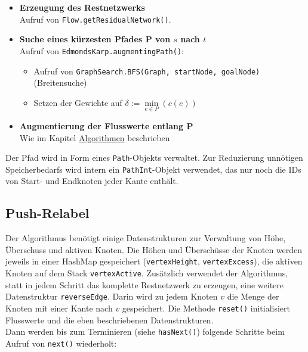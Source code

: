 \documentclass{llncs}
\begin{document}
\begin{itemize}
\item \textbf{Erzeugung des Restnetzwerks}\\
Aufruf von \texttt{Flow.getResidualNetwork()}.
\item \textbf{Suche eines kürzesten Pfades P von $s$ nach $t$}\\
Aufruf von \texttt{EdmondsKarp.augmentingPath()}: 
\begin{itemize} 
\item Aufruf von \texttt{GraphSearch.BFS(Graph, startNode, goalNode)} (Breitensuche)
\item Setzen der Gewichte auf $\delta := \min \limits_{e\in P}(c(e))$ 
\end{itemize}
\item \textbf{Augmentierung der Flusswerte entlang P}\\
Wie im Kapitel \hyperlink{augLink}{Algorithmen} beschrieben\\
\end{itemize}
Der Pfad wird in Form eines \texttt{Path}-Objekts verwaltet. Zur Reduzierung unnötigen Speicherbedarfs wird intern ein \texttt{PathInt}-Objekt verwendet, das nur noch die IDs von Start- und Endknoten jeder Kante enthält. 

\subsection{Push-Relabel}

Der Algorithmus benötigt einige Datenstrukturen zur Verwaltung von Höhe, Überschuss und aktiven Knoten. Die Höhen und Überschüsse der Knoten werden jeweils in einer HashMap gespeichert (\texttt{vertexHeight}, \texttt{vertexExcess}), die aktiven Knoten auf dem Stack \texttt{vertexActive}. Zusätzlich verwendet der Algorithmus, statt in jedem Schritt das komplette Restnetzwerk zu erzeugen, eine weitere Datenstruktur \texttt{reverseEdge}.
Darin wird zu jedem Knoten $v$ die Menge der Knoten mit einer Kante nach $v$ gespeichert. 
Die Methode \texttt{reset()} initialisiert Flusswerte und die eben beschriebenen Datenstrukturen. \\
Dann werden bis zum Terminieren (siehe \texttt{hasNext()}) folgende Schritte beim Aufruf von \texttt{next()} wiederholt:
\end{document}
